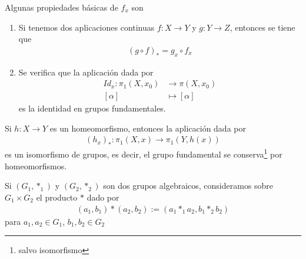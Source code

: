 \begin{propiedades}
    Algunas propiedades básicas de $f_x$ son
    \begin{enumerate}
        \item Si tenemos dos aplicaciones continuas $f:X\to Y$ y $g:Y \to Z$, entonces se tiene que 
        \begin{gather*}
            (g\circ f)_* = g_x \circ f_x
        \end{gather*}

        \item  Se verifica que la aplicación dada por
        \begin{align*}
            Id_x: \pi_1(X,x_0) &\to \pi(X,x_0)\\
            [\alpha] & \mapsto [\alpha]
        \end{align*}
        es la identidad en grupos fundamentales.
    \end{enumerate}
\end{propiedades}

\begin{coro}
    Si $h:X\to Y$ es un homeomorfismo, entonces la aplicación dada por
    \begin{gather*}
        (h_x)_*:\pi_1(X,x) \to \pi_1(Y,h(x))
    \end{gather*}
    es un isomorfismo de grupos, es decir, el grupo fundamental se conserva\footnote{salvo isomorfismo} por homeomorfismos.
\end{coro}

\begin{definicion}
    Si $(G_1,\ast_1)$ y $(G_2, \ast_2)$ son dos grupos algebraicos, consideramos sobre $G_1\times G_2$ el producto $\ast$ dado por 
    \begin{gather*}
        (a_1,b_1)\ast(a_2,b_2) := (a_1\ast_1 a_2, b_1 \ast_2 b_2)
    \end{gather*}
    para $a_1,a_2\in G_1$, $b_1,b_2\in G_2$
\end{definicion}

